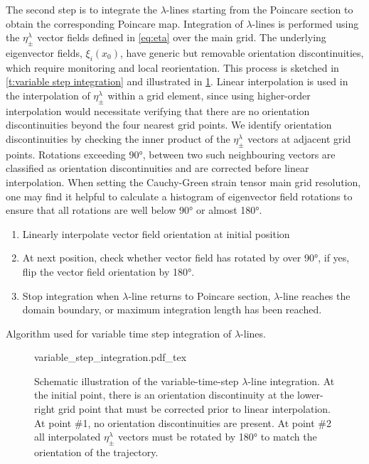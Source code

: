 \documentclass[5p]{elsarticle}
\begin{document}
The second step is to integrate the $\lambda$-lines  starting from the Poincare section to obtain the corresponding Poincare map. Integration of $\lambda$-lines is performed using the $\eta_\pm^\lambda$ vector fields defined in \cref{eq:eta} over the main grid. The underlying eigenvector fields, $\xi_i(x_0)$, have generic but removable orientation discontinuities, which require monitoring and local reorientation. This process is sketched in \cref{t:variable step integration} and illustrated in \cref{f:variable step integration}. Linear interpolation is used in the interpolation of $\eta_\pm^\lambda$ within a grid element, since using higher-order interpolation would necessitate verifying that there are no orientation discontinuities beyond the four nearest grid points. We identify orientation discontinuities by checking the inner product of the $\eta_\pm^\lambda$ vectors at adjacent grid points. Rotations exceeding 90°, between two such neighbouring vectors are classified as orientation discontinuities and are corrected before linear interpolation. When setting the Cauchy-Green strain tensor main grid resolution, one may find it helpful to calculate a histogram of eigenvector field rotations to ensure that all rotations are well below 90° or almost 180°.

\begin{table}
\begin{enumerate}
\item Linearly interpolate vector field orientation at initial position
\item At next position, check whether vector field has rotated by over 90°, if yes, flip the vector field orientation by 180°.
\item Stop integration when $\lambda$-line returns to Poincare section, $\lambda$-line reaches the domain boundary, or maximum integration length has been reached.
\end{enumerate}
\caption{Algorithm used for variable time step integration of $\lambda$-lines.}
\label{t:variable step integration}
\end{table}

\begin{figure}
\begin{center}
\def\svgwidth{.4\textwidth}
{variable_step_integration.pdf_tex}
\end{center}
\caption{Schematic illustration of the variable-time-step $\lambda$-line integration. At the initial point, there is an orientation discontinuity at the lower-right grid point that must be corrected prior to linear interpolation. At point \#1, no orientation discontinuities are present. At point \#2 all interpolated $\eta_\pm^\lambda$ vectors must be rotated by 180° to match the orientation of the trajectory.}
\label{f:variable step integration}
\end{figure}
\end{document}
